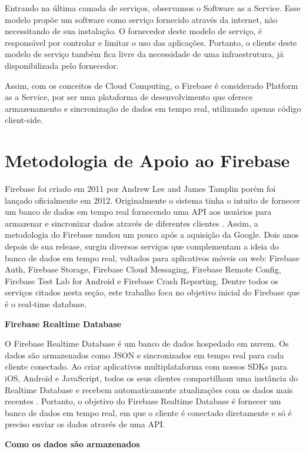 \documentclass[12pt]{article}
\begin{document}
Entrando na última camada de serviços, observamos o Software as a Service. Esse modelo propõe um software como serviço fornecido através da internet, não necessitando de sua instalação. O fornecedor deste modelo de serviço, é responsável por controlar e limitar o uso das aplicações. Portanto, o cliente deste modelo de serviço também fica livre da necessidade de uma infraestrutura, já disponibilizada pelo fornecedor.

Assim, com os conceitos de Cloud Computing, o Firebase é considerado Platform as a Service, por ser uma plataforma de desenvolvimento que oferece armazenamento e sincronização de dados em tempo real, utilizando apenas código client-side. 

\section{Metodologia de Apoio ao Firebase}  \label{sec:metodologia}

Firebase foi criado em 2011 por Andrew Lee and James Tamplin porém foi lançado oficialmente em 2012. Originalmente o sistema tinha o intuito de fornecer um banco de dados em tempo real fornecendo uma API aos usuários para armazenar e sincronizar dados através de diferentes clientes \cite{3}. Assim, a metodologia do Firebase mudou um pouco após a aquisição da Google. Dois anos depois de sua release, surgiu diversos serviços que complementam a ideia do banco de dados em tempo real, voltados para aplicativos móveis ou web: Firebase Auth, Firebase Storage, Firebase Cloud Messaging, Firebase Remote Config, Firebase Test Lab for Android e Firebase Crash Reporting. Dentre todos os serviços citados nesta seção, este trabalho foca no objetivo inicial do Firebase que é o real-time database.

\textbf{Firebase Realtime Database}

O Firebase Realtime Database é um banco de dados hospedado em nuvem. Os dados são armazenados como JSON e sincronizados em tempo real para cada cliente conectado. Ao criar aplicativos multiplataforma com nossos SDKs para iOS, Android e JavaScript, todos os seus clientes compartilham uma instância do Realtime Database e recebem automaticamente atualizações com os dados mais recentes \cite{Firebase}. Portanto, o objetivo do Firebase Realtime Database é fornecer um banco de dados em tempo real, em que o cliente é conectado diretamente e só  é preciso enviar os dados através de uma API.

\textbf{Como os dados são armazenados}
\end{document}
